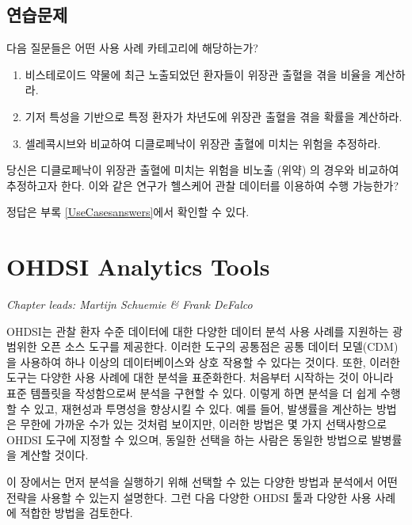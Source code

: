 \documentclass[11pt]{book}
\theoremstyle{definition}
\theoremstyle{definition}
\theoremstyle{definition}
\theoremstyle{remark}
\let\BeginKnitrBlock\begin \let\EndKnitrBlock\end
\begin{document}
\section{연습문제}

\BeginKnitrBlock{exercise}
\protect\hypertarget{exr:exerciseUseCases1}{}{\label{exr:exerciseUseCases1}
}다음 질문들은 어떤 사용 사례 카테고리에 해당하는가?

\begin{enumerate}
\def\labelenumi{\arabic{enumi}.}
\item
  비스테로이드 약물에 최근 노출되었던 환자들이 위장관 출혈을 겪을 비율을
  계산하라.
\item
  기저 특성을 기반으로 특정 환자가 차년도에 위장관 출혈을 겪을 확률을
  계산하라.
\item
  셀레콕시브와 비교하여 디클로페낙이 위장관 출혈에 미치는 위험을
  추정하라.
\end{enumerate}
\EndKnitrBlock{exercise}

\BeginKnitrBlock{exercise}
\protect\hypertarget{exr:exerciseUseCases2}{}{\label{exr:exerciseUseCases2}
}당신은 디클로페낙이 위장관 출혈에 미치는 위험을 비노출 (위약) 의 경우와
비교하여 추정하고자 한다. 이와 같은 연구가 헬스케어 관찰 데이터를
이용하여 수행 가능한가?
\EndKnitrBlock{exercise}

정답은 부록 \ref{UseCasesanswers}에서 확인할 수 있다.

\chapter{OHDSI Analytics Tools}\label{OhdsiAnalyticsTools}

\emph{Chapter leads: Martijn Schuemie \& Frank DeFalco}

OHDSI는 관찰 환자 수준 데이터에 대한 다양한 데이터 분석 사용 사례를
지원하는 광범위한 오픈 소스 도구를 제공한다. 이러한 도구의 공통점은 공통
데이터 모델(CDM)을 사용하여 하나 이상의 데이터베이스와 상호 작용할 수
있다는 것이다. 또한, 이러한 도구는 다양한 사용 사례에 대한 분석을
표준화한다. 처음부터 시작하는 것이 아니라 표준 템플릿을 작성함으로써
분석을 구현할 수 있다. 이렇게 하면 분석을 더 쉽게 수행할 수 있고,
재현성과 투명성을 향상시킬 수 있다. 예를 들어, 발생률을 계산하는 방법은
무한에 가까운 수가 있는 것처럼 보이지만, 이러한 방법은 몇 가지
선택사항으로 OHDSI 도구에 지정할 수 있으며, 동일한 선택을 하는 사람은
동일한 방법으로 발병률을 계산할 것이다.

이 장에서는 먼저 분석을 실행하기 위해 선택할 수 있는 다양한 방법과
분석에서 어떤 전략을 사용할 수 있는지 설명한다. 그런 다음 다양한 OHDSI
툴과 다양한 사용 사례에 적합한 방법을 검토한다.
\end{document}
